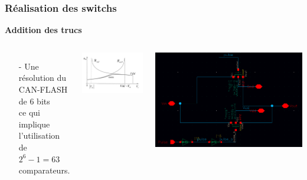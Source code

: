 \documentclass{beamer}
\begin{document}

\begin{frame}
\frametitle{R\'ealisation des switchs}

\textbf{Addition des trucs}

\begin{columns}[T]
  \begin{itemize}
    \item[-] Une r\'esolution du CAN-FLASH de 6 bits\\ce qui implique l'utilisation de $2^{6} -1 = 63 $ comparateurs.
  \end{itemize}
  \includegraphics[width=0.9\linewidth]{switch_fonct.png}

  \hspace*{-0.5cm}
  \includegraphics[width=\linewidth]{switchs_.png}
\end{columns}

\end{frame}
\end{document}
